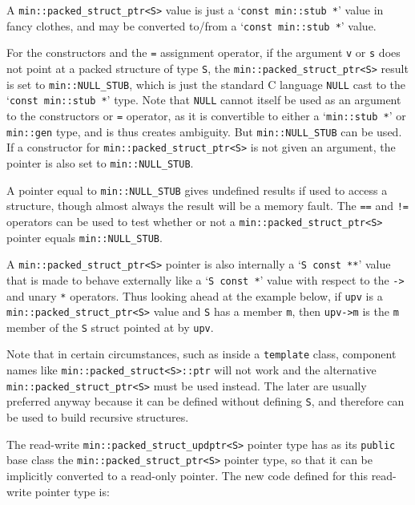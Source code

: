 \documentclass[12pt]{article}
\newcommand{\EOL}{\penalty \exhyphenpenalty}
\newcommand{\BRACKETED}[1]{{\tt <#1>}}
\newcommand{\SARG}{\BRACKETED{S}}
\begin{document}
A {\tt min::\EOL packed\_\EOL struct\_\EOL ptr\SARG} value is just
a `{\tt const min::stub~*}' value in fancy clothes, and may be
converted to/from a `{\tt const min::stub~*}' value.

For the constructors and the {\tt =} assignment operator, if the
argument \verb|v| or \verb|s| does not point at a packed structure
of type {\tt S}, the {\tt min::\EOL packed\_\EOL struct\_\EOL ptr\SARG}
result is set to {\tt min::\EOL NULL\_\EOL STUB},
which is just the standard C language \verb|NULL|
cast to the `\verb|const min::stub *|' type.
Note that \verb|NULL| cannot itself be used as an argument to
the constructors or {\tt =} operator, as it is
convertible to either a `\verb|min::stub *|'
or \verb|min::gen| type, and is thus creates ambiguity.
But {\tt min::\EOL NULL\_\EOL STUB} can be used.
If a constructor for {\tt min::\EOL packed\_\EOL struct\_\EOL ptr\SARG}
is not given an argument, the pointer is also set to
{\tt min::\EOL NULL\_\EOL STUB}.

A pointer equal to
{\tt min::\EOL NULL\_\EOL STUB} gives undefined results if
used to access a structure,
though almost always the result will be a memory fault.
The {\tt ==} and {\tt !=} operators can be used to test whether
or not a {\tt min::\EOL packed\_\EOL struct\_\EOL ptr\SARG} pointer
equals {\tt min::\EOL NULL\_\EOL STUB}.

A {\tt min::\EOL packed\_\EOL struct\_\EOL ptr\SARG} pointer is also
internally a `\verb|S const **|' value that is made to behave externally like a
`\verb|S const *|' value with respect to the \verb|->| and
unary \verb|*| operators.  Thus looking ahead at the example below,
if \verb|upv| is a
{\tt min::\EOL packed\_\EOL struct\_\EOL ptr\SARG} value
and \verb|S| has a member \verb|m|, then \verb|upv->m| is the \verb|m|
member of the \verb|S| struct pointed at by \verb|upv|.

Note that in certain
circumstances, such as inside a {\tt template} class,
component names like {\tt min::\EOL packed\_\EOL struct<S>::ptr} will not work
and the alternative {\tt min::\EOL packed\_\EOL struct\_\EOL ptr<S>}
must be used instead.  The later are usually preferred anyway because
it can be defined without defining \verb|S|, and therefore can be
used to build recursive structures.

The read-write {\tt min::\EOL packed\_\EOL struct\_\EOL updptr\SARG}
pointer type has 
as its {\tt public} base class the
{\tt min::\EOL packed\_\EOL struct\_\EOL ptr\SARG} pointer type,
so that it can be implicitly converted to
a read-only pointer.  The new code defined for this read-write
pointer type is:
\end{document}
